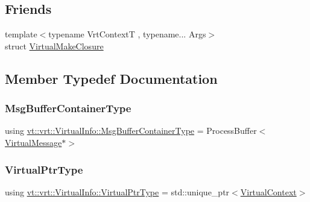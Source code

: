 \subsection*{Friends}
\begin{DoxyCompactItemize}
\item 
{\footnotesize template$<$typename Vrt\+ContextT , typename... Args$>$ }\\struct \hyperlink{structvt_1_1vrt_1_1_virtual_info_a6d27b32cd35d056a4d8bf6ba43f28f62}{Virtual\+Make\+Closure}
\end{DoxyCompactItemize}


\subsection{Member Typedef Documentation}
\mbox{\label{structvt_1_1vrt_1_1_virtual_info_a0f7b9bd9d5ae38c1e9df13e946b21814}} 
\subsubsection{\texorpdfstring{Msg\+Buffer\+Container\+Type}{MsgBufferContainerType}}
{\footnotesize\ttfamily using \hyperlink{structvt_1_1vrt_1_1_virtual_info_a0f7b9bd9d5ae38c1e9df13e946b21814}{vt\+::vrt\+::\+Virtual\+Info\+::\+Msg\+Buffer\+Container\+Type} =  Process\+Buffer$<$\hyperlink{structvt_1_1vrt_1_1_virtual_message}{Virtual\+Message}$\ast$$>$}

\mbox{\label{structvt_1_1vrt_1_1_virtual_info_aede28e76785423dd2685fe4cf54afa21}} 
\subsubsection{\texorpdfstring{Virtual\+Ptr\+Type}{VirtualPtrType}}
{\footnotesize\ttfamily using \hyperlink{structvt_1_1vrt_1_1_virtual_info_aede28e76785423dd2685fe4cf54afa21}{vt\+::vrt\+::\+Virtual\+Info\+::\+Virtual\+Ptr\+Type} =  std\+::unique\+\_\+ptr$<$\hyperlink{structvt_1_1vrt_1_1_virtual_context}{Virtual\+Context}$>$}



